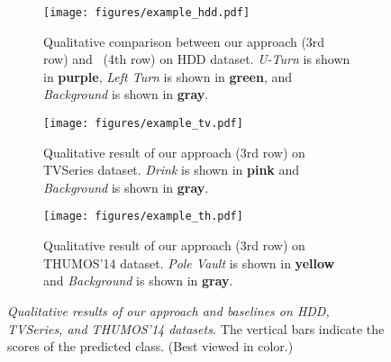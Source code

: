 \begin{figure*}
    \center
    \begin{subfigure}[t]{1.0\textwidth}
        \center
        \texttt{[image: figures/example\_hdd.pdf]}
        \vspace{-6pt}
        \caption{
            Qualitative comparison between our approach (3rd row)
            and~\cite{RamanishkaCVPR2018} (4th row) on HDD dataset.
            \textit{U-Turn} is shown in \textbf{\textcolor{mypurple}{purple}},
            \textit{Left Turn} is shown in \textbf{\textcolor{mygreen}{green}},
            and \textit{Background} is shown in \textbf{\textcolor{mygray}{gray}}.
        }
        \vspace{4pt}
        \label{fig:exp_hdd}
    \end{subfigure}
    \begin{subfigure}[t]{1.0\textwidth}
        \center
        \texttt{[image: figures/example\_tv.pdf]}
        \vspace{-6pt}
        \caption{
            Qualitative result of our approach (3rd row) on TVSeries
            dataset. \textit{Drink} is shown in \textbf{\textcolor{mypink}{pink}} and
            \textit{Background} is shown in \textbf{\textcolor{mygray}{gray}}.
        }
        \vspace{4pt}
        \label{fig:exp_tv}
    \end{subfigure}
    \begin{subfigure}[t]{1.0\textwidth}
        \center
        \texttt{[image: figures/example\_th.pdf]}
        \vspace{-6pt}
        \caption{
            Qualitative result of our approach (3rd row) on THUMOS'14
            dataset. \textit{Pole Vault} is shown in \textbf{\textcolor{myyellow}{yellow}}
            and \textit{Background} is shown in \textbf{\textcolor{mygray}{gray}}.
        }
        \vspace{4pt}
        \label{fig:exp_th}
    \end{subfigure}
    \vspace{-10pt}
    \caption{
        \textit{Qualitative results of our approach and baselines on HDD, TVSeries, and
        THUMOS'14 datasets.} 
The vertical bars
        indicate the scores of the predicted class. (Best viewed in color.) 
    }
    \label{fig:results}
    \vspace{-10pt}
\end{figure*}
 

